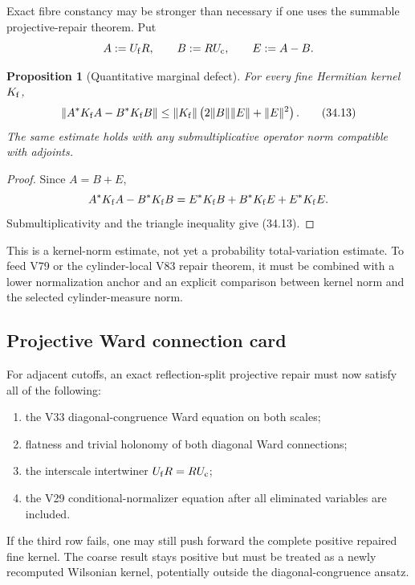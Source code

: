 \documentclass[11pt]{article}
\newtheorem{proposition}[theorem]{Proposition}
\theoremstyle{remark}
\begin{document}
Exact fibre constancy may be stronger than necessary if one uses the
summable projective-repair theorem.  Put
\[
 A:=U_{\rm f}R,\qquad B:=RU_{\rm c},\qquad
 E:=A-B.
\]

\begin{proposition}[Quantitative marginal defect]
\label{prop:v12v34-defect}
For every fine Hermitian kernel \(K_{\rm f}\),
\begin{equation}
 \left\|
 A^*K_{\rm f}A-B^*K_{\rm f}B
 \right\|
 \leq
 \|K_{\rm f}\|
 \left(2\|B\|\|E\|+\|E\|^2\right).               \tag{34.13}
\end{equation}
The same estimate holds with any submultiplicative operator norm
compatible with adjoints.
\end{proposition}

\begin{proof}
Since \(A=B+E\),
\[
 A^*K_{\rm f}A-B^*K_{\rm f}B
 =
 E^*K_{\rm f}B+B^*K_{\rm f}E+E^*K_{\rm f}E.
\]
Submultiplicativity and the triangle inequality give (34.13).
\end{proof}

This is a kernel-norm estimate, not yet a probability
total-variation estimate.  To feed V79 or the cylinder-local V83
repair theorem, it must be combined with a lower normalization
anchor and an explicit comparison between kernel norm and the
selected cylinder-measure norm.

\subsection{Projective Ward connection card}

For adjacent cutoffs, an exact reflection-split projective repair
must now satisfy all of the following:

\begin{enumerate}
\item the V33 diagonal-congruence Ward equation on both scales;
\item flatness and trivial holonomy of both diagonal Ward
connections;
\item the interscale intertwiner \(U_{\rm f}R=RU_{\rm c}\);
\item the V29 conditional-normalizer equation after all eliminated
variables are included.
\end{enumerate}

If the third row fails, one may still push forward the complete
positive repaired fine kernel.  The coarse result stays positive but
must be treated as a newly recomputed Wilsonian kernel, potentially
outside the diagonal-congruence ansatz.
\end{document}
